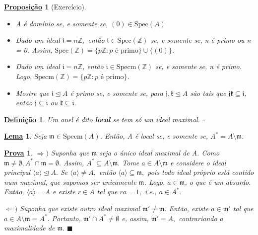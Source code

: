 \documentclass{article}
\newtheorem*{def*}{\underline{Defini\c c\~ao}}
\newtheorem*{lemma*}{\underline{Lema}}
\newtheorem*{prop*}{\underline{Proposi\c c\~ao}}
\newtheorem*{proof*}{\underline{Prova}}
\renewcommand\qedsymbol{$\blacksquare$}
\begin{document}
\begin{prop*}[Exercício]
  \begin{itemize}
    \item[1)] A é domínio se, e somente se, \((0)\in \mathrm{Spec}(A)\)
    \item[2)] Dado um ideal \(\mathfrak{i} = n \mathbb{Z},\) então \(\mathfrak{i}\in \mathrm{Spec}(\mathbb{Z})\) se, e somente se,
      n é primo ou n = 0. Assim, \(\mathrm{Spec}(\mathbb{Z}) = \{p \mathbb{Z}: p \text{ é primo}\}\cup \{(0)\}\).
    \item[3)] Dado um ideal \(\mathfrak{i} = n \mathbb{Z}\), então \(\mathfrak{i}\in \mathrm{Specm}(\mathbb{Z})\) se, e somente se,
      n é primo. Logo, \(\mathrm{Specm}(\mathbb{Z}) = \{p \mathbb{Z}:p \text{ é primo}\}\).
    \item[4)] Mostre que \(\mathfrak{i}\trianglelefteq A\) é primo se, e somente se, para \(\mathfrak{j}, \mathfrak{k}\trianglelefteq A\) são tais que \(\mathfrak{j}\mathfrak{k}\subseteq \mathfrak{i}\), então 
      \(\mathfrak{j}\subseteq \mathfrak{i}\) ou \(\mathfrak{k}\subseteq \mathfrak{i}\).
  \end{itemize}
\end{prop*}
\begin{def*}
  Um anel é dito \textbf{local} se tem só um ideal maximal. \(\square\)
\end{def*}
\begin{lemma*}
  Seja \(\mathfrak{m}\in \mathrm{Specm}(A)\). Então, A é local se, e somente se, \(A^{*} = A\setminus{\mathfrak{m}}\).
\end{lemma*}
\begin{proof*}
  \(\Rightarrow )\) Suponha que \(\mathfrak{m}\) seja o único ideal maximal de A. Como \(\mathfrak{m} \neq\emptyset, A^{*}\cap \mathfrak{m} = \emptyset\).
  Assim, \(A^{*}\subseteq{A\setminus{\mathfrak{m}}}.\) Tome \(a\in A\setminus{\mathfrak{m}}\) e considere o ideal principal \(\langle a \rangle \trianglelefteq{A}.\)
  Se \(\langle a \rangle\neq A,\) então \(\langle a \rangle \subseteq{\mathfrak{m}},\) pois todo ideal próprio está contido num maximal, que supomos ser unicamente \(\mathfrak{m}\).
  Logo, \(a\in \mathfrak{m}\), o que é um absurdo. Então, \(\langle a \rangle = A\) e existe \(r\in A\) tal que \(ra = 1,\) i.e., \(a\in A^{*}.\)

  \(\Leftarrow )\) Suponha que existe outro ideal maximal \(\mathfrak{m}'\neq \mathfrak{m}.\) Então, existe \(a\in \mathfrak{m}'\)
  tal que \(a\in A\setminus{\mathfrak{m}} = A^{*}.\) Portanto, \(\mathfrak{m}'\cap A^{*} \neq\emptyset\) e, assim, \(\mathfrak{m}' = A,\)
  contrariando a maximalidade de \(\mathfrak{m}.\) \qedsymbol
\end{proof*}
\end{document}
